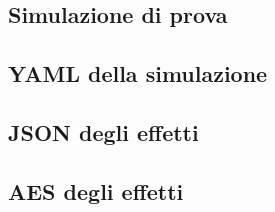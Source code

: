 
\appendix
\begin{appendices}
    \chapter{Simulazione di prova}\label{app:test}
        \section{YAML della simulazione}\label{app:yaml}
            
            \clearpage

        \section{JSON degli effetti}\label{app:json}
            
            \clearpage

        \section{AES degli effetti}\label{app:aes}
            
\end{appendices}



